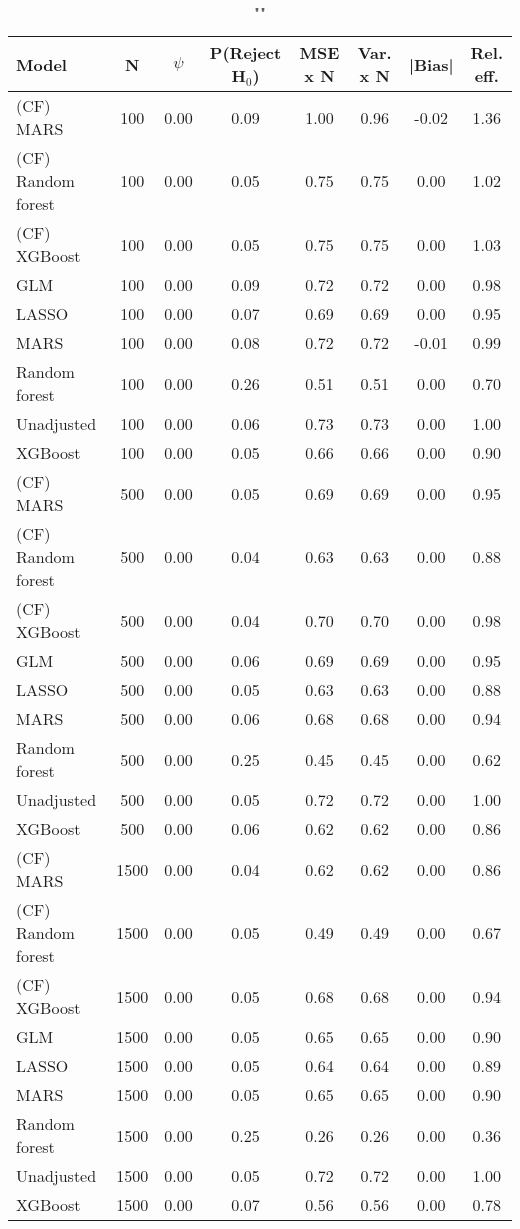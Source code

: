 \begin{table}
\centering
\caption{""}
\begin{tabular}{lccccccc}
\toprule
Model & N & $\psi$ & P(Reject H$_0$) & MSE x N & Var. x N & |Bias| & Rel. eff.\\ \midrule
(CF) MARS & 100 & 0.00 & 0.09 & 1.00 & 0.96 & -0.02 & 1.36 \\ 
(CF) Random forest & 100 & 0.00 & 0.05 & 0.75 & 0.75 &  0.00 & 1.02 \\ 
(CF) XGBoost & 100 & 0.00 & 0.05 & 0.75 & 0.75 &  0.00 & 1.03 \\ 
GLM & 100 & 0.00 & 0.09 & 0.72 & 0.72 &  0.00 & 0.98 \\ 
LASSO & 100 & 0.00 & 0.07 & 0.69 & 0.69 &  0.00 & 0.95 \\ 
MARS & 100 & 0.00 & 0.08 & 0.72 & 0.72 & -0.01 & 0.99 \\ 
Random forest & 100 & 0.00 & 0.26 & 0.51 & 0.51 &  0.00 & 0.70 \\ 
Unadjusted & 100 & 0.00 & 0.06 & 0.73 & 0.73 &  0.00 & 1.00 \\ 
XGBoost & 100 & 0.00 & 0.05 & 0.66 & 0.66 &  0.00 & 0.90 \\ \addlinespace 
(CF) MARS & 500 & 0.00 & 0.05 & 0.69 & 0.69 &  0.00 & 0.95 \\ 
(CF) Random forest & 500 & 0.00 & 0.04 & 0.63 & 0.63 &  0.00 & 0.88 \\ 
(CF) XGBoost & 500 & 0.00 & 0.04 & 0.70 & 0.70 &  0.00 & 0.98 \\ 
GLM & 500 & 0.00 & 0.06 & 0.69 & 0.69 &  0.00 & 0.95 \\ 
LASSO & 500 & 0.00 & 0.05 & 0.63 & 0.63 &  0.00 & 0.88 \\ 
MARS & 500 & 0.00 & 0.06 & 0.68 & 0.68 &  0.00 & 0.94 \\ 
Random forest & 500 & 0.00 & 0.25 & 0.45 & 0.45 &  0.00 & 0.62 \\ 
Unadjusted & 500 & 0.00 & 0.05 & 0.72 & 0.72 &  0.00 & 1.00 \\ 
XGBoost & 500 & 0.00 & 0.06 & 0.62 & 0.62 &  0.00 & 0.86 \\ \addlinespace 
(CF) MARS & 1500 & 0.00 & 0.04 & 0.62 & 0.62 &  0.00 & 0.86 \\ 
(CF) Random forest & 1500 & 0.00 & 0.05 & 0.49 & 0.49 &  0.00 & 0.67 \\ 
(CF) XGBoost & 1500 & 0.00 & 0.05 & 0.68 & 0.68 &  0.00 & 0.94 \\ 
GLM & 1500 & 0.00 & 0.05 & 0.65 & 0.65 &  0.00 & 0.90 \\ 
LASSO & 1500 & 0.00 & 0.05 & 0.64 & 0.64 &  0.00 & 0.89 \\ 
MARS & 1500 & 0.00 & 0.05 & 0.65 & 0.65 &  0.00 & 0.90 \\ 
Random forest & 1500 & 0.00 & 0.25 & 0.26 & 0.26 &  0.00 & 0.36 \\ 
Unadjusted & 1500 & 0.00 & 0.05 & 0.72 & 0.72 &  0.00 & 1.00 \\ 
XGBoost & 1500 & 0.00 & 0.07 & 0.56 & 0.56 &  0.00 & 0.78 \\
\bottomrule
\end{tabular}
\end{table}

